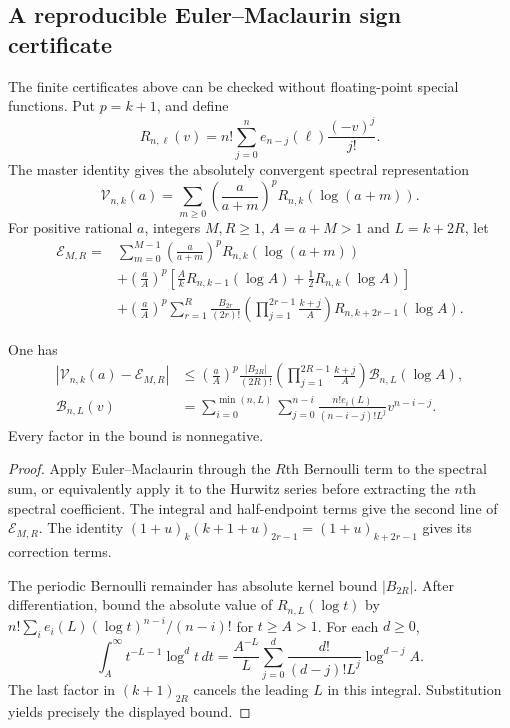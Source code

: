 \subsection{A reproducible Euler--Maclaurin sign certificate}
The finite certificates above can be checked without floating-point special
functions. Put $p=k+1$, and define
\[
R_{n,\ell}(v)=n!\sum_{j=0}^n
 e_{n-j}(\ell)\frac{(-v)^j}{j!}.
\]
The master identity gives the absolutely convergent spectral representation
\[
\mathcal V_{n,k}(a)=\sum_{m\ge0}
 \left(\frac a{a+m}\right)^p R_{n,k}(\log(a+m)).
\]
For positive rational $a$, integers $M,R\ge1$, $A=a+M>1$ and $L=k+2R$,
let
\begin{align*}
\mathcal E_{M,R}={}&\sum_{m=0}^{M-1}
 \left(\frac a{a+m}\right)^p R_{n,k}(\log(a+m))\\
&+\left(\frac aA\right)^p\left[
 \frac Ak R_{n,k-1}(\log A)+\frac12R_{n,k}(\log A)\right]\\
&+\left(\frac aA\right)^p
 \sum_{r=1}^R\frac{B_{2r}}{(2r)!}
 \left(\prod_{j=1}^{2r-1}\frac{k+j}{A}\right)
 R_{n,k+2r-1}(\log A).
\end{align*}
\begin{proposition}
One has
\begin{align*}
\left|\mathcal V_{n,k}(a)-\mathcal E_{M,R}\right|
&\le\left(\frac aA\right)^p
 \frac{|B_{2R}|}{(2R)!}
 \left(\prod_{j=1}^{2R-1}\frac{k+j}{A}\right)
 \mathcal B_{n,L}(\log A),\\
\mathcal B_{n,L}(v)
&=\sum_{i=0}^{\min(n,L)}\sum_{j=0}^{n-i}
 \frac{n!e_i(L)}{(n-i-j)!L^j}v^{n-i-j}.
\end{align*}
Every factor in the bound is nonnegative.
\end{proposition}
\begin{proof}
Apply Euler--Maclaurin through the $R$th Bernoulli term to the spectral
sum, or equivalently apply it to the Hurwitz series before extracting the
$n$th spectral coefficient. The integral and half-endpoint terms give the
second line of $\mathcal E_{M,R}$. The identity
$(1+u)_k(k+1+u)_{2r-1}=(1+u)_{k+2r-1}$ gives its correction terms.

The periodic Bernoulli remainder has absolute kernel bound $|B_{2R}|$.
After differentiation, bound the absolute value of $R_{n,L}(\log t)$
by $n!\sum_i e_i(L)(\log t)^{n-i}/(n-i)!$ for $t\ge A>1$.
For each $d\ge0$,
\[
\int_A^\infty t^{-L-1}\log^d t\,dt
=\frac{A^{-L}}L\sum_{j=0}^d
 \frac{d!}{(d-j)!L^j}\log^{d-j}A.
\]
The last factor in $(k+1)_{2R}$ cancels the leading $L$ in this
integral. Substitution yields precisely the displayed bound.
\end{proof}


